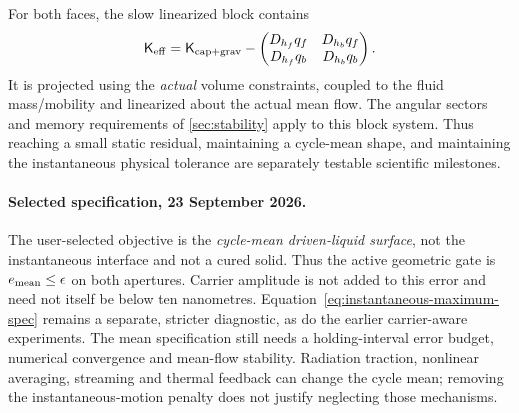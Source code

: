 For both faces, the slow linearized block contains
\[
 \mathsf K_{\rm eff}=\mathsf K_{\rm cap+grav}
  -\begin{pmatrix}
       D_{h_f}q_f&D_{h_b}q_f\\D_{h_f}q_b&D_{h_b}q_b
    \end{pmatrix}.
\]
It is projected using the \emph{actual} volume constraints, coupled to the fluid
mass/mobility and linearized about the actual mean flow. The angular sectors
and memory requirements of \cref{sec:stability} apply to this block system.
Thus reaching a small static residual, maintaining a cycle-mean shape, and
maintaining the instantaneous physical tolerance are separately testable
scientific milestones.

\paragraph{Selected specification, 23 September 2026.}
The user-selected objective is the \emph{cycle-mean driven-liquid surface},
not the instantaneous interface and not a cured solid. Thus the active
geometric gate is $e_{\rm mean}\leq\epsilon$ on both apertures. Carrier
amplitude is not added to this error and need not itself be below ten
nanometres. Equation~\eqref{eq:instantaneous-maximum-spec} remains a separate,
stricter diagnostic, as do the earlier carrier-aware experiments.
The mean specification still needs a holding-interval error budget, numerical
convergence and mean-flow stability. Radiation traction, nonlinear averaging,
streaming and thermal feedback can change the cycle mean; removing the
instantaneous-motion penalty does not justify neglecting those mechanisms.
